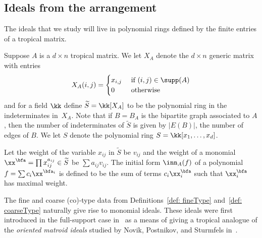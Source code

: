 \subsection{Ideals from the arrangement}
The ideals that we study will live in polynomial rings defined by the finite entries of a tropical matrix.

\begin{notation}\label{not: cellRings}
Suppose $A$ is a $d \times n$ tropical matrix.  We let $X_A$ denote the $d \times n$ generic matrix with entries 
\begin{align*}
    X_A (i,j) = \begin{cases}
    x_{i,j} &\text{ if } (i,j)\in\supp(A)\\
    0 &\text{ otherwise}
    \end{cases}
\end{align*}
and for a field $\kk$ define $\widetilde S = \kk[X_A]$ to be the polynomial ring in the indeterminates in~$X_A$.  Note that if $B = B_A$ is the bipartite graph associated to $A$, then the number of indeterminates of $\widetilde S$ is given by $|E(B)|$, the number of edges of $B$. We let $S$ denote the polynomial ring $S = \kk[x_1,\dots, x_d]$.

Let the weight of the variable $x_{ij}$ in $\widetilde S$ be $v_{ij}$ and the weight of a monomial $\xx^\bfa = \prod x_{ij}^{a_{ij}}\in \widetilde S$ be $\sum a_{ij} v_{ij}$.
The initial form $\inn_A(f)$ of a polynomial $f = \sum c_i \xx^{\bfa_i}$ is defined to be the sum of terms $c_i \xx^\bfa_i$ such that $\xx^\bfa_i$ has maximal weight.
\end{notation}


The fine and coarse (co)-type data from Definitions~\ref{def: fineType} and~\ref{def: coarseType} naturally give rise to monomial ideals. These ideals were first introduced in the full-support case in~\cite{dochtermann2012tropical} as a means of giving a tropical analogue of the \emph{oriented matroid ideals} studied by Novik, Postnikov, and Sturmfels in~\cite{NPS}.

